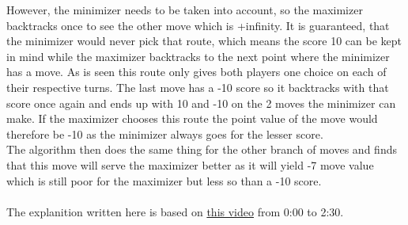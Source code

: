 However, the minimizer needs to be taken into account, so the maximizer backtracks once to see the other move which is +infinity. 
It is guaranteed, that the minimizer would never pick that route, which means the score 10 can be kept in mind while the maximizer backtracks to the next point where the minimizer has a move. 
As is seen this route only gives both players one choice on each of their respective turns. 
The last move has a -10 score so it backtracks with that score once again and ends up with 10 and -10 on the 2 moves the minimizer can make. 
If the maximizer chooses this route the point value of the move would therefore be -10 as the minimizer always goes for the lesser score.\\
The algorithm then does the same thing for the other branch of moves and finds that this move will serve the maximizer better as it will yield -7 move value which is still poor for the maximizer but less so than a -10 score.\\\\
The explanition written here is based on \href{https://www.youtube.com/watch?v=l-hh51ncgDI}{this video} from 0:00 to 2:30.
\clearpage
